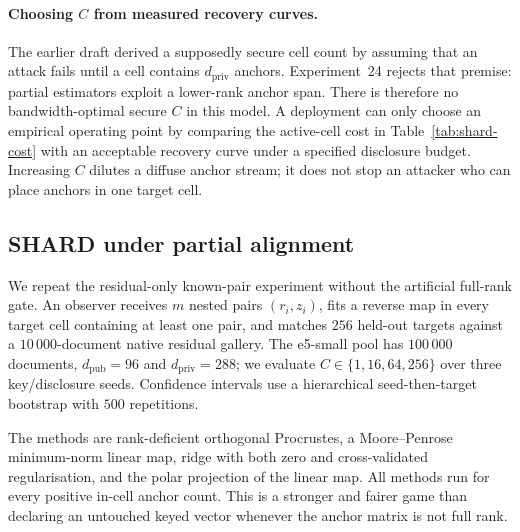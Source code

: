 \paragraph{Choosing $C$ from measured recovery curves.}
The earlier draft derived a supposedly secure cell count by assuming that an
attack fails until a cell contains $d_{\mathrm{priv}}$ anchors. Experiment~24
rejects that premise: partial estimators exploit a lower-rank anchor span.
There is therefore no bandwidth-optimal secure $C$ in this model. A
deployment can only choose an empirical operating point by comparing the
active-cell cost in Table~\ref{tab:shard-cost} with an acceptable recovery
curve under a specified disclosure budget. Increasing $C$ dilutes a diffuse
anchor stream; it does not stop an attacker who can place anchors in one
target cell.

\subsection{SHARD under partial alignment}\label{ssec:shard-align}

We repeat the residual-only known-pair experiment without the artificial
full-rank gate. An observer receives $m$ nested pairs $(r_i,z_i)$, fits a
reverse map in every target cell containing at least one pair, and matches
$256$ held-out targets against a $10\,000$-document native residual gallery.
The e5-small pool has $100\,000$ documents, $d_{\mathrm{pub}}=96$ and
$d_{\mathrm{priv}}=288$; we evaluate $C\in\{1,16,64,256\}$ over three
key/disclosure seeds. Confidence intervals use a hierarchical
seed-then-target bootstrap with $500$ repetitions.

The methods are rank-deficient orthogonal Procrustes, a Moore--Penrose
minimum-norm linear map, ridge with both zero and cross-validated
regularisation, and the polar projection of the linear map. All methods run
for every positive in-cell anchor count. This is a stronger and fairer game
than declaring an untouched keyed vector whenever the anchor matrix is not
full rank.

